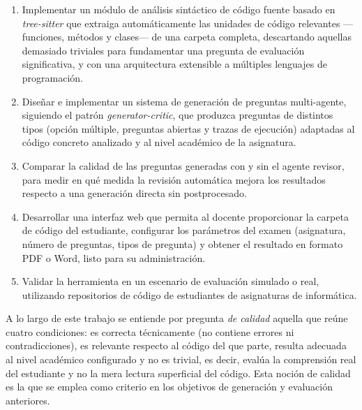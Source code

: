 \begin{enumerate}

  \item Implementar un módulo de análisis sintáctico de código fuente
        basado en \emph{tree-sitter} que extraiga automáticamente las
        unidades de código relevantes ---funciones, métodos y clases--- de
        una carpeta completa, descartando aquellas demasiado triviales para
        fundamentar una pregunta de evaluación significativa, y con una
        arquitectura extensible a múltiples lenguajes de programación.

  \item Diseñar e implementar un sistema de generación de preguntas
        multi-agente, siguiendo el patrón \emph{generator-critic}, que
        produzca preguntas de distintos tipos (opción múltiple, preguntas
        abiertas y trazas de ejecución) adaptadas al código concreto
        analizado y al nivel académico de la asignatura.

  \item Comparar la calidad de las preguntas generadas con y sin el agente
        revisor, para medir en qué medida la revisión automática mejora
        los resultados respecto a una generación directa sin postprocesado.

  \item Desarrollar una interfaz web que permita al docente proporcionar
        la carpeta de código del estudiante, configurar los parámetros del
        examen (asignatura, número de preguntas, tipos de pregunta) y
        obtener el resultado en formato PDF o Word, listo para su
        administración.

  \item Validar la herramienta en un escenario de evaluación simulado o
        real, utilizando repositorios de código de estudiantes de
        asignaturas de informática.

\end{enumerate}

A lo largo de este trabajo se entiende por pregunta \emph{de calidad}
aquella que reúne cuatro condiciones: es correcta técnicamente (no
contiene errores ni contradicciones), es relevante respecto al código
del que parte, resulta adecuada al nivel académico configurado y no es
trivial, es decir, evalúa la comprensión real del estudiante y no la
mera lectura superficial del código. Esta noción de calidad es la que se
emplea como criterio en los objetivos de generación y evaluación
anteriores.
